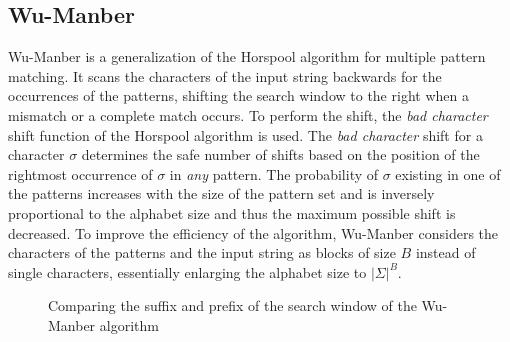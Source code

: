 \documentclass{ws-ijait}
\begin{document}
\subsection{Wu-Manber}

Wu-Manber is a generalization of the Horspool algorithm for multiple pattern matching. It scans the characters of the input string backwards for the occurrences of the patterns, shifting the search window to the right when a mismatch or a complete match occurs. To perform the shift, the \textit{bad character} shift function of the Horspool algorithm is used. The \textit{bad character} shift for a character $\sigma$ determines the safe number of shifts based on the position of the rightmost occurrence of $\sigma$ in \textit{any} pattern. The probability of $\sigma$ existing in one of the patterns increases with the size of the pattern set and is inversely proportional to the alphabet size and thus the maximum possible shift is decreased. To improve the efficiency of the algorithm, Wu-Manber considers the characters of the patterns and the input string as blocks of size $B$ instead of single characters, essentially enlarging the alphabet size to $|\Sigma|^B$.

\begin{figure}[h]
\centering
{}
  \caption{Comparing the suffix and prefix of the search window of the Wu-Manber algorithm}
  \label{fig:wu_manber_border}
\end{figure}
\end{document}
